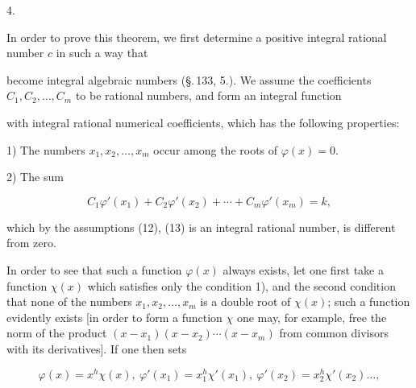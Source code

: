 4. 





In order to prove this theorem, we first determine a positive integral rational number $c$ in such a way that


become integral algebraic numbers (§.\,133, 5.). We assume the coefficients $C_1, C_2, \ldots, C_m$ to be  rational numbers, and form an integral function


with integral rational numerical coefficients, which has the following properties:

1) The numbers $x_1, x_2, \ldots, x_m$ occur among the roots of $\varphi(x)=0$.

2) The sum

\[
C_1\varphi'(x_1)+C_2\varphi'(x_2)+\cdots+C_m\varphi'(x_m) = k,
\]

which by the assumptions (12), (13) is an integral rational number, is different from zero.

In order to see that such a function $\varphi(x)$ always exists, let one first take a function $\chi(x)$ which satisfies only the condition 1), and the second condition that none of the numbers $x_1, x_2, \ldots, x_m$ is a double root of $\chi(x)$; such a function evidently exists [in order to form a function $\chi$ one may, for example, free the norm of the product $(x-x_1)(x-x_2)\cdots(x-x_m)$ from common divisors with its derivatives]. If one then sets

\[
\varphi(x) = x^h\chi(x),\ \varphi'(x_1) = x_1^h\chi'(x_1),\ \varphi'(x_2) = x_2^h\chi'(x_2)\ldots,
\]
